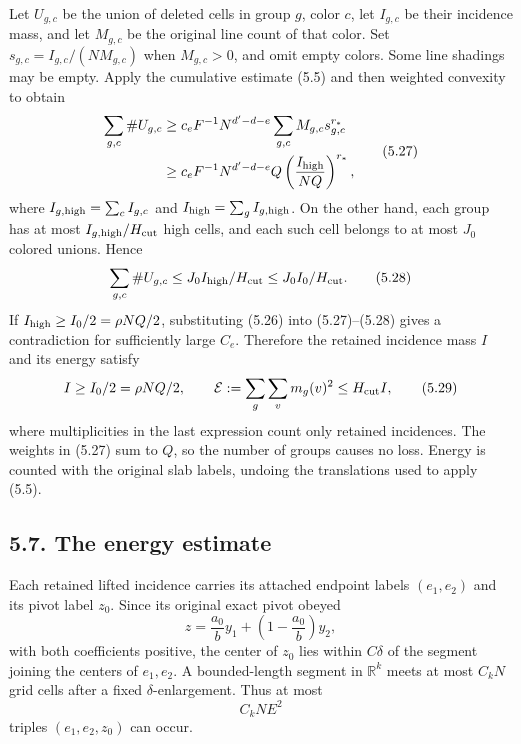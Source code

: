 \documentclass[
  11pt,
  a4paper,
]{article}
\begin{document}
Let \(U_{g,c}\) be the union of deleted cells in group \(g\), color
\(c\), let \(I_{g,c}\) be their incidence mass, and let \(M_{g,c}\) be
the original line count of that color. Set
\(s_{g,c}=I_{g,c}/(NM_{g,c})\) when \(M_{g,c}>0\), and omit empty
colors. Some line shadings may be empty. Apply the cumulative estimate
(5.5) and then weighted convexity to obtain \[
 \begin{aligned}
 \sum_{g,c}\#U_{g,c}
 &\ge c_eF^{-1}N^{d'-d-e}\sum_{g,c}M_{g,c}s_{g,c}^{r_*}\\
 &\ge c_eF^{-1}N^{d'-d-e}Q
          \left(\frac{I_{\rm high}}{NQ}\right)^{r_*},
 \end{aligned}                                    \tag{5.27}\label{eq:5.27}
\] where \(I_{g,\rm high}=\sum_c I_{g,c}\) and
\(I_{\rm high}=\sum_g I_{g,\rm high}\). On the other hand, each group
has at most \(I_{g,\rm high}/H_{\rm cut}\) high cells, and each such
cell belongs to at most \(J_0\) colored unions. Hence \[
 \sum_{g,c}\#U_{g,c}
 \le J_0 I_{\rm high}/H_{\rm cut}
 \le J_0 I_0/H_{\rm cut}.                         \tag{5.28}\label{eq:5.28}
\] If \(I_{\rm high}\ge I_0/2=\rho NQ/2\), substituting (5.26) into
(5.27)--(5.28) gives a contradiction for sufficiently large \(C_e\).
Therefore the retained incidence mass \(I\) and its energy satisfy \[
 I\ge I_0/2=\rho NQ/2,\qquad
 \mathcal E:=\sum_g\sum_v m_g(v)^2\le H_{\rm cut}I,
                                                               \tag{5.29}\label{eq:5.29}
\] where multiplicities in the last expression count only retained
incidences. The weights in (5.27) sum to \(Q\), so the number of groups
causes no loss. Energy is counted with the original slab labels, undoing
the translations used to apply (5.5).

\hypertarget{the-energy-estimate}{%
\subsection{5.7. The energy estimate}\label{the-energy-estimate}}

Each retained lifted incidence carries its attached endpoint labels
\((e_1,e_2)\) and its pivot label \(z_0\). Since its original exact
pivot obeyed \[
 z=\frac{a_0}{b}y_1+\left(1-\frac{a_0}{b}\right)y_2,
\] with both coefficients positive, the center of \(z_0\) lies within
\(C\delta\) of the segment joining the centers of \(e_1,e_2\). A
bounded-length segment in \(\mathbb R^k\) meets at most \(C_kN\) grid
cells after a fixed \(\delta\)-enlargement. Thus at most \[
 C_kNE^2                                             \tag{5.30}\label{eq:5.30}
\] triples \((e_1,e_2,z_0)\) can occur.
\end{document}
